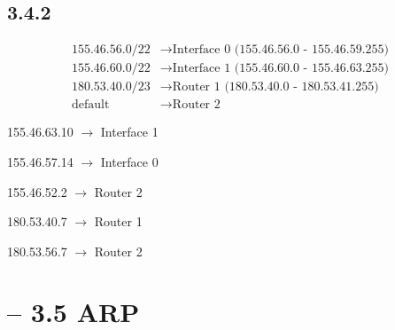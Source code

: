 \documentclass[a4paper,
			llpt,
			solution,
			accentcolor=tud2d,
			colorbacktitle
			]
			{tudexercise}
\newcommand{\8}{$\infty$}
\begin{document}
\subsection{3.4.2}
\begin{align*}
155.46.56.0/22 &\rightarrow \text{Interface 0 (155.46.56.0 - 155.46.59.255)}\\
155.46.60.0/22 &\rightarrow \text{Interface 1 (155.46.60.0 - 155.46.63.255)}\\
180.53.40.0/23 &\rightarrow \text{Router 1 (180.53.40.0 - 180.53.41.255)}\\
\text{default} &\rightarrow \text{Router 2}
\end{align*}
\begin{multicols}{3}
\begin{compactenum}
\item 155.46.63.10 $\rightarrow$ Interface 1
\item 155.46.57.14 $\rightarrow$ Interface 0
\item 155.46.52.2  $\rightarrow$ Router 2
\item 180.53.40.7  $\rightarrow$ Router 1
\item 180.53.56.7  $\rightarrow$ Router 2
\end{compactenum}
\end{multicols}
\section{ -- 3.5 ARP}
\end{document}
